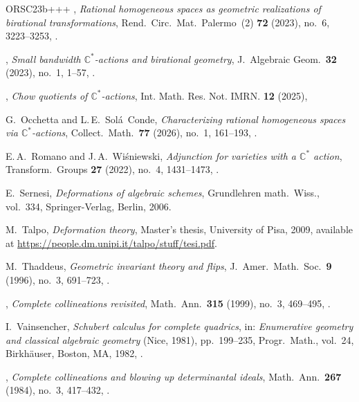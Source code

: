 \begin{thebibliography}{ORSC\etalchar{+}23b+++}
\bysame, 
\emph{Rational homogeneous spaces as geometric realizations of birational
  transformations}, 
Rend.\ Circ.\ Mat.\ Palermo~(2) \textbf{72} (2023), no.~6, 3223--3253, 
.

\bysame, 
\emph{Small bandwidth {$\mathbb C^*$}-actions and birational geometry}, 
J.~Algebraic Geom.\ \textbf{32} (2023), no.~1, 1--57,
.

\bysame, 
\emph{Chow quotients of $\mathbb{C}^*$-actions}, 
Int. Math. Res. Not. IMRN. \textbf{12} (2025), 

G.~Occhetta and L.\,E.~Sol{\'a}~Conde, 
\emph{Characterizing rational homogeneous spaces via {$\mathbb
  C^*$}-actions}, 
Collect.\ Math.\ \textbf{77} (2026), no.~1, 161--193,
.

E.\,A.~Romano and J.\,A.~Wi\'{s}niewski, 
\emph{Adjunction for varieties with a {$\mathbb{C}^*$} action}, 
Transform.\ Groups \textbf{27} (2022), no.~4, 1431--1473,
.

E.~Sernesi, 
\emph{Deformations of algebraic schemes},
Grundlehren math.\ Wiss.,  vol.~334, 
Springer-Verlag, Berlin, 2006.

M.~Talpo, 
\emph{Deformation theory}, 
Master's thesis, University of Pisa, 2009, available at \url{https://people.dm.unipi.it/talpo/stuff/tesi.pdf}.

M.~Thaddeus, 
\emph{Geometric invariant theory and flips}, 
J.~Amer.\ Math.\ Soc.\ \textbf{9} (1996), no.~3, 691--723,
.

\bysame, 
\emph{Complete collineations revisited}, 
Math.\ Ann.\ \textbf{315} (1999), no.~3, 469--495,
.

I.~Vainsencher, 
\emph{Schubert calculus for complete quadrics}, 
in: \emph{Enumerative geometry and classical algebraic geometry}
  ({N}ice, 1981),  pp.~199--235, Progr.\ Math., vol.~24, 
Birkh\"auser, Boston, MA, 1982,
.

  \bysame,
  \emph{Complete collineations and blowing up determinantal ideals}, 
  Math.\ Ann.\ \textbf{267} (1984), no.~3, 417--432,
  .

\end{thebibliography}
